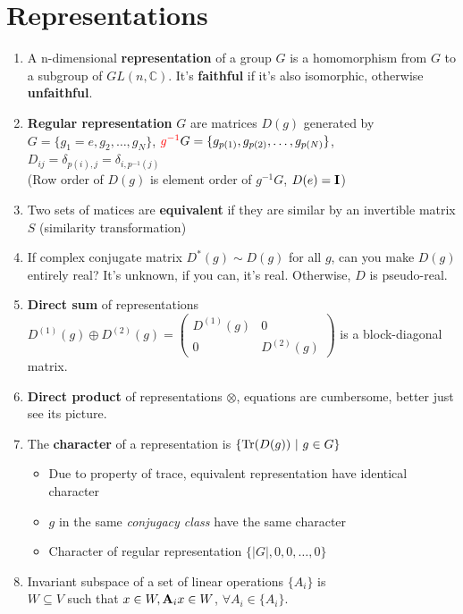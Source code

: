 \documentclass{article}
\theoremstyle{remark}
\theoremstyle{remark}
\begin{document}
\section*{Representations}
    \begin{enumerate}
        \item A n-dimensional \textbf{representation} of a group $G$ is a homomorphism from $G$ to a subgroup of $GL(n,\mathbb{C})$. It's \textbf{faithful} if it's also isomorphic, otherwise \textbf{unfaithful}.
        \item \textbf{Regular representation} $G$ are matrices $D(g)$ generated by\\ $G=\{g_1=e,g_2,\ldots,g_N\}$, $\textcolor{red}{g^{-1}}G=\{g_{p(1)},g_{p(2)},\ldots,g_{p(N)}\}$,
                $D_{ij}=\delta_{p(i),j}=\delta_{i,p^{-1}(j)}$\\
                (Row order of $D(g)$ is element order of $g^{-1}G$, $D(e)=\vb{I}$)
        \item Two sets of matices are \textbf{equivalent} if they are similar by an invertible matrix $S$ (similarity transformation)
        \item If complex conjugate matrix $D^*(g)\sim D(g)$ for all $g$, can you make $D(g)$ entirely real? It's unknown, if you can, it's real. Otherwise, $D$ is pseudo-real.
        \item \textbf{Direct sum} of representations $D^{(1)}(g)\oplus D^{(2)}(g)=\begin{pmatrix}
                    D^{(1)}(g) & 0\\0 & D^{(2)}(g)
                \end{pmatrix}$ is a block-diagonal matrix.
        \item \textbf{Direct product} of representations $\otimes$, equations are cumbersome, better just see its picture.
        \item The \textbf{character} of a representation is $\{\Tr(D(g))\ |\ g\in G\}$\begin{itemize}
                \item Due to property of trace, equivalent representation have identical character
                \item $g$ in the same \emph{conjugacy class} have the same character
                \item Character of regular representation $\{|G|,0,0,\ldots,0\}$
            \end{itemize}
        \item Invariant subspace of a set of linear operations $\{A_i\}$ is\\ $W\subseteq V$ such that $x\in W, \vb{A}_ix\in W$, $\forall A_i\in \{A_i\}$.\\

\end{enumerate}
\end{document}
